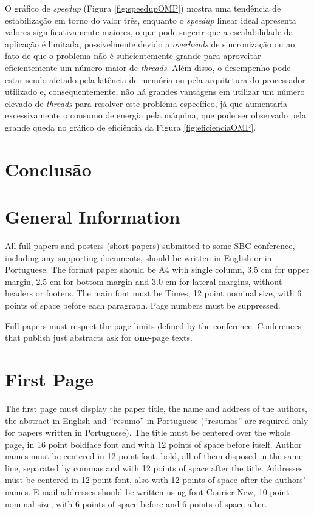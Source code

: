 \documentclass[12pt]{article}
\begin{document}
O gráfico de \textit{speedup} (Figura \ref{fig:speedupOMP}) mostra uma tendência de estabilização em torno do valor três, enquanto o \textit{speedup} linear ideal apresenta valores significativamente maiores, o que pode sugerir que a escalabilidade da aplicação é limitada, possivelmente devido a \textit{overheads} de sincronização ou ao fato de que o problema não é suficientemente grande para aproveitar eficientemente um número maior de \textit{threads}. Além disso, o desempenho pode estar sendo afetado pela latência de memória ou pela arquitetura do processador utilizado e, consequentemente, não há grandes vantagens em utilizar um número elevado de \textit{threads} para resolver este problema específico, já que aumentaria excessivamente o consumo de energia pela máquina, que pode ser observado pela grande queda no gráfico de eficiência da Figura \ref{fig:eficienciaOMP}.

\section{Conclusão}

\section{General Information}

All full papers and posters (short papers) submitted to some SBC conference,
including any supporting documents, should be written in English or in
Portuguese. The format paper should be A4 with single column, 3.5 cm for upper
margin, 2.5 cm for bottom margin and 3.0 cm for lateral margins, without
headers or footers. The main font must be Times, 12 point nominal size, with 6
points of space before each paragraph. Page numbers must be suppressed.

Full papers must respect the page limits defined by the conference.
Conferences that publish just abstracts ask for \textbf{one}-page texts.

\section{First Page} \label{sec:firstpage}

The first page must display the paper title, the name and address of the
authors, the abstract in English and ``resumo'' in Portuguese (``resumos'' are
required only for papers written in Portuguese). The title must be centered
over the whole page, in 16 point boldface font and with 12 points of space
before itself. Author names must be centered in 12 point font, bold, all of
them disposed in the same line, separated by commas and with 12 points of
space after the title. Addresses must be centered in 12 point font, also with
12 points of space after the authors' names. E-mail addresses should be
written using font Courier New, 10 point nominal size, with 6 points of space
before and 6 points of space after.
\end{document}
